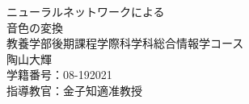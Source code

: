 \begin{titlepage}
\begin{center}
\vspace*{160truept}
{\huge ニューラルネットワークによる}\\
\vspace{10truept}
{\huge 音色の変換}\\
\vspace{200truept}
{\Large 教養学部後期課程学際科学科総合情報学コース}\\
\vspace{10truept}
{\Large 陶山大輝}\\
\vspace{10truept}
{\Large 学籍番号：08-192021}\\
\vspace{10truept}
{\Large 指導教官：金子知適准教授}\\  
\end{center}
\end{titlepage}